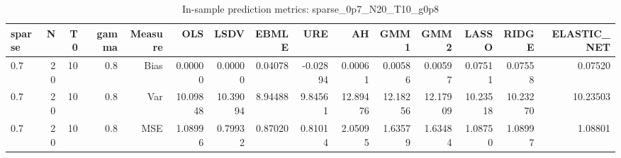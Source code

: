 \begin{table}[!htbp]\centering
\caption{In-sample prediction metrics: sparse_0p7_N20_T10_g0p8}
\label{tab:table2_sparse_0p7_N20_T10_g0p8}
\begin{tabular}{lrrrrrrrrrrrrrr}
\hline
sparse & N & T0 & gamma & Measure & OLS & LSDV & EBMLE & URE & AH & GMM1 & GMM2 & LASSO & RIDGE & ELASTIC_NET \\
\hline
0.7 & 20 & 10 & 0.8 & Bias & 0.00000 & 0.00000 & 0.04078 & -0.02894 & 0.00061 & 0.00586 & 0.00597 & 0.07511 & 0.07558 & 0.07520 \\
0.7 & 20 & 10 & 0.8 & Var & 10.09848 & 10.39094 & 8.94488 & 9.84561 & 12.89476 & 12.18256 & 12.17909 & 10.23518 & 10.23270 & 10.23503 \\
0.7 & 20 & 10 & 0.8 & MSE & 1.08996 & 0.79932 & 0.87020 & 0.81014 & 2.05095 & 1.63579 & 1.63484 & 1.08750 & 1.08997 & 1.08801 \\
\hline
\end{tabular}
\end{table}

